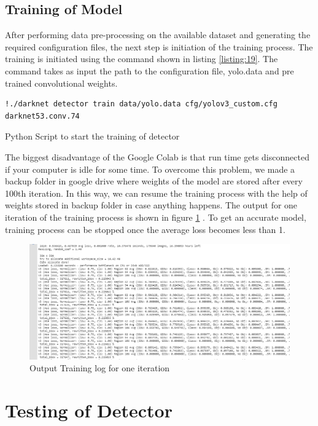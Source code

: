 \subsection{Training of Model}
After performing data pre-processing on the available dataset and generating the required configuration files, the next step 
is initiation  of the training process. The training is initiated using the command shown in listing \ref{listing:19}. The command takes as input the path to the configuration file, yolo.data and pre trained convolutional weights.
\begin{longlisting}
\begin{verbatim}
!./darknet detector train data/yolo.data cfg/yolov3_custom.cfg darknet53.conv.74 
\end{verbatim}
\caption{Python Script to start the training of detector}
\label{listing:19}
\end{longlisting}
The biggest disadvantage of the Google Colab is that run time gets disconnected if your computer is idle for some time. To overcome this problem, we made a backup folder in google drive  where weights of the model are stored after every 100th iteration. In this way, we can resume the training process with the help of weights stored in backup folder in case anything happens. The output for one iteration of the training process is shown in figure \ref{fig:5.8} . To get an accurate model, training process can be stopped once the average loss becomes less than 1. 

\begin{figure}[H]
\centering
\captionsetup{justification = centering}
\includegraphics[scale= 0.6]{CHAPTERS/Chapter-5/images/5.8.PNG}
\caption{ Output Training log for one iteration } 
\label{fig:5.8}
\end{figure}

\section{Testing of Detector}
